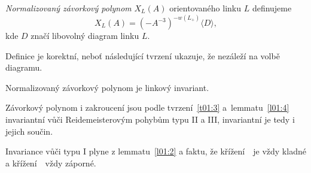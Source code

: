 \begin{definice}\label{def01:4}
\emph{Normalizovaný závorkový polynom} $X_L(A)$ orientovaného linku $L$ definujeme $$X_L(A) = \left(-A^{-3}\right)^{-w\left(L_+\right)}\langle D \rangle,$$ kde $D$ značí libovolný diagram linku $L$.
\end{definice}

\begin{pozn}
Definice je korektní, neboť následující tvrzení ukazuje, že nezáleží na volbě diagramu.
\end{pozn}

\begin{tvrz}\label{t01:5}
Normalizovaný závorkový polynom je linkový invariant.
\end{tvrz}
\begin{dukaz}
Závorkový polynom i zakroucení jsou podle tvrzení~\ref{t01:3} a~lemmatu~\ref{l01:4} invariantní vůči Reidemeisterovým pohybům typu II a III, invariantní je tedy i jejich součin.

Invariance vůči typu I plyne z lemmatu~\ref{l01:2} a faktu, že křížení~\plussmycka~je vždy kladné a křížení~\minussmycka~vždy záporné.
\end{dukaz}

